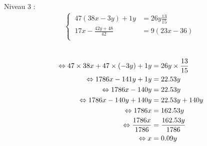\documentclass{article}%
\begin{document}
Niveau 3 :%
\begin{align*}%
\begin{cases}%
\  47(38x - 3y) + 1y &= 26y\frac{13}{15} \\%
\  17x - \frac{42y + 48}{42} &= 9(23x - 36) \\%
\end{cases}%
\\%
\end{align*}%
\ \\%
\vspace{5mm}%
\newline%
\begin{align*}%
\   \Leftrightarrow 47\times38x + 47\times(-3y) + 1y &= 26y \times \frac{13}{15} \\%
\vspace{5mm}%
\newline%
\  \Leftrightarrow 1786x - 141y + 1y &= 22.53y \\%
\vspace{5mm}%
\newline%
\  \Leftrightarrow 1786x - 140y &= 22.53y\\%
\vspace{5mm}%
\newline%
\  \Leftrightarrow 1786x - 140y + 140y &= 22.53y + 140y\\%
\vspace{5mm}%
\newline%
\  \Leftrightarrow 1786x &= 162.53y \\%
\vspace{5mm}%
\newline%
\  \Leftrightarrow \frac{1786x}{1786} &= \frac{162.53y}{1786} \\%
\vspace{5mm}%
\newline%
\  \Leftrightarrow x &= 0.09y \\%
\vspace{5mm}%
\newline%
\end{align*}%
\\%
\ \\%
\vspace{5mm}%
\newline%
\end{document}
